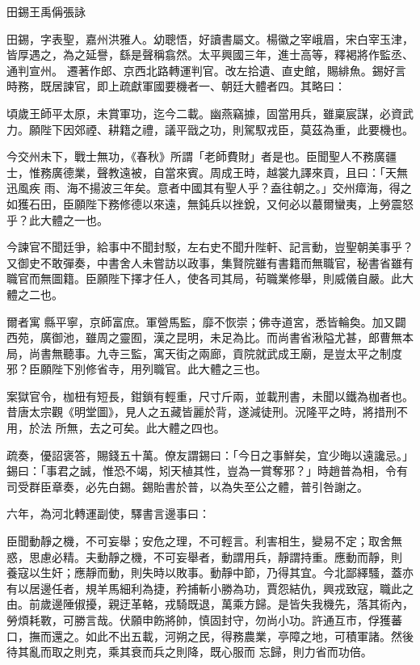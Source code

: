 
\begin{pinyinscope}

 田錫王禹偁張詠



 田錫，字表聖，嘉州洪雅人。幼聰悟，好讀書屬文。楊徽之宰峨眉，宋白宰玉津，皆厚遇之，為之延譽，繇是聲稱翕然。太平興國三年，進士高等，釋褐將作監丞、通判宣州。
 遷著作郎、京西北路轉運判官。改左拾遺、直史館，賜緋魚。錫好言時務，既居諫官，即上疏獻軍國要機者一、朝廷大體者四。其略曰：



 頃歲王師平太原，未賞軍功，迄今二載。幽燕竊據，固當用兵，雖稟宸謀，必資武力。願陛下因郊禋、耕籍之禮，議平戩之功，則駕馭戎臣，莫茲為重，此要機也。



 今交州未下，戰士無功，《春秋》所謂「老師費財」者是也。臣聞聖人不務廣疆士，惟務廣德業，聲教遠被，自當來賓。周成王時，越裳九譯來貢，且曰：「天無迅風疾
 雨、海不揚波三年矣。意者中國其有聖人乎？盍往朝之。」交州瘴海，得之如獲石田，臣願陛下務修德以來遠，無鈍兵以挫銳，又何必以蕞爾蠻夷，上勞震怒乎？此大體之一也。



 今諫官不聞廷爭，給事中不聞封駁，左右史不聞升陛軒、記言動，豈聖朝美事乎？又御史不敢彈奏，中書舍人未嘗訪以政事，集賢院雖有書籍而無職官，秘書省雖有職官而無圖籍。臣願陛下擇才任人，使各司其局，茍職業修舉，則威儀自嚴。此大體之二也。



 爾者寓
 縣平寧，京師富庶。軍營馬監，靡不恢崇；佛寺道宮，悉皆輪奐。加又闢西苑，廣御池，雖周之靈囿，漢之昆明，未足為比。而尚書省湫隘尤甚，郎曹無本局，尚書無聽事。九寺三監，寓天街之兩廊，貢院就武成王廟，是豈太平之制度邪？臣願陛下別修省寺，用列職官。此大體之三也。



 案獄官令，枷杻有短長，鉗鎖有輕重，尺寸斤兩，並載刑書，未聞以鐵為枷者也。昔唐太宗觀《明堂圖》，見人之五藏皆麗於背，遂減徒刑。況隆平之時，將措刑不用，於法
 所無，去之可矣。此大體之四也。



 疏奏，優詔褒答，賜錢五十萬。僚友謂錫曰：「今日之事鮮矣，宜少晦以遠讒忌。」錫曰：「事君之誠，惟恐不竭，矧天植其性，豈為一賞奪邪？」時趙普為相，令有司受群臣章奏，必先白錫。錫貽書於普，以為失至公之體，普引咎謝之。



 六年，為河北轉運副使，驛書言邊事曰：



 臣聞動靜之機，不可妄舉；安危之理，不可輕言。利害相生，變易不定；取舍無惑，思慮必精。夫動靜之機，不可妄舉者，動謂用兵，靜謂持重。應動而靜，則
 養寇以生奸；應靜而動，則失時以敗事。動靜中節，乃得其宜。今北鄙繹騷，蓋亦有以居邊任者，規羊馬細利為捷，矜捕斬小勝為功，賈怨結仇，興戎致寇，職此之由。前歲邊陲俶擾，親迂革輅，戎騎既退，萬乘方歸。是皆失我機先，落其術內，勞煩耗斁，可勝言哉。伏願申飭將帥，慎固封守，勿尚小功。許通互市，俘獲蕃口，撫而還之。如此不出五載，河朔之民，得務農業，亭障之地，可積軍諸。然後待其亂而取之則克，乘其衰而兵之則降，既心服而
 忘歸，則力省而功倍。




\end{pinyinscope}
